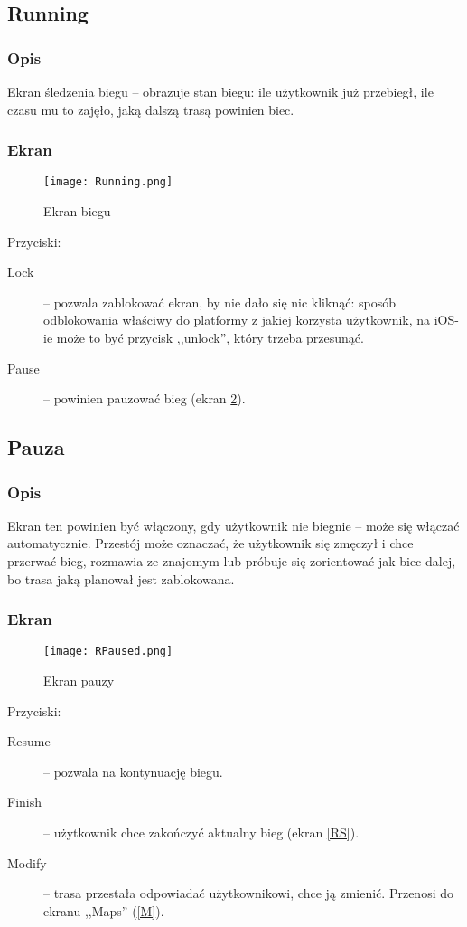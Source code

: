 \subsection{Running}
\subsubsection{Opis}
\noindent Ekran śledzenia biegu -- obrazuje stan biegu: ile użytkownik już przebiegł, ile czasu mu to zajęło, jaką dalszą trasą powinien biec.
\subsubsection{Ekran}
\begin{figure}[b!]
  \texttt{[image: Running.png]}
  \caption{Ekran biegu}
  \label{R}
\end{figure}
Przyciski:\\
\begin{description}
  \item[Lock] -- pozwala zablokować ekran, by nie dało się nic kliknąć: sposób odblokowania właściwy do platformy z jakiej korzysta użytkownik, na iOS-ie może to być przycisk ,,unlock'', który trzeba przesunąć.
  \item[Pause] -- powinien pauzować bieg (ekran \ref{RP}).
\end{description}
\subsection{Pauza}
\subsubsection{Opis}
\noindent Ekran ten powinien być włączony, gdy użytkownik nie biegnie -- może się włączać automatycznie. Przestój może oznaczać, że użytkownik się zmęczył i chce przerwać bieg, rozmawia ze znajomym lub próbuje się zorientować jak biec dalej, bo trasa jaką planował jest zablokowana.
\subsubsection{Ekran}
\begin{figure}[b!]
  \texttt{[image: RPaused.png]}
  \caption{Ekran pauzy}
  \label{RP}
\end{figure}
Przyciski:\\
\begin{description}
  \item[Resume] -- pozwala na kontynuację biegu.
  \item[Finish] -- użytkownik chce zakończyć aktualny bieg (ekran \ref{RS}).
  \item[Modify] -- trasa przestała odpowiadać użytkownikowi, chce ją zmienić. Przenosi do ekranu ,,Maps'' (\ref{M}).
\end{description}
